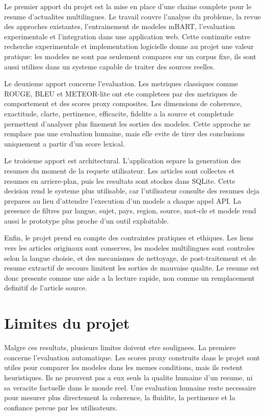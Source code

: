 Le premier apport du projet est la mise en place d'une chaine complete pour le resume d'actualites multilingues. Le travail couvre l'analyse du probleme, la revue des approches existantes, l'entrainement de modeles mBART, l'evaluation experimentale et l'integration dans une application web. Cette continuite entre recherche experimentale et implementation logicielle donne au projet une valeur pratique: les modeles ne sont pas seulement compares sur un corpus fixe, ils sont aussi utilises dans un systeme capable de traiter des sources reelles.

Le deuxieme apport concerne l'evaluation. Les metriques classiques comme ROUGE, BLEU et METEOR-lite ont ete completees par des metriques de comportement et des scores proxy composites. Les dimensions de coherence, exactitude, clarte, pertinence, efficacite, fidelite a la source et completude permettent d'analyser plus finement les sorties des modeles. Cette approche ne remplace pas une evaluation humaine, mais elle evite de tirer des conclusions uniquement a partir d'un score lexical.

Le troisieme apport est architectural. L'application separe la generation des resumes du moment de la requete utilisateur. Les articles sont collectes et resumes en arriere-plan, puis les resultats sont stockes dans SQLite. Cette decision rend le systeme plus utilisable, car l'utilisateur consulte des resumes deja prepares au lieu d'attendre l'execution d'un modele a chaque appel API\@. La presence de filtres par langue, sujet, pays, region, source, mot-cle et modele rend aussi le prototype plus proche d'un outil exploitable.

Enfin, le projet prend en compte des contraintes pratiques et ethiques. Les liens vers les articles originaux sont conserves, les modeles multilingues sont controles selon la langue choisie, et des mecanismes de nettoyage, de post-traitement et de resume extractif de secours limitent les sorties de mauvaise qualite. Le resume est donc presente comme une aide a la lecture rapide, non comme un remplacement definitif de l'article source.

\section{Limites du projet}

Malgre ces resultats, plusieurs limites doivent etre soulignees. La premiere concerne l'evaluation automatique. Les scores proxy construits dans le projet sont utiles pour comparer les modeles dans les memes conditions, mais ils restent heuristiques. Ils ne prouvent pas a eux seuls la qualite humaine d'un resume, ni sa veracite factuelle dans le monde reel. Une evaluation humaine reste necessaire pour mesurer plus directement la coherence, la fluidite, la pertinence et la confiance percue par les utilisateurs.

